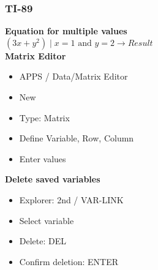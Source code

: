 	\begin{minipage}[t]{9.5cm}
		\subsubsection{TI-89}
			\textbf{Equation for multiple values}\\
			$(3x+y^2) \mid x=1 \text{ and } y=2 \to Result$\\
			\textbf{Matrix Editor}
			\begin{itemize}
			  \item APPS / Data/Matrix Editor
			  \item New
			  \item Type: Matrix
			  \item Define Variable, Row, Column
			  \item Enter values
			\end{itemize}

			\textbf{Delete saved variables}
			\begin{itemize}
			\item Explorer: 2nd / VAR-LINK
			\item Select variable
			\item Delete: DEL
			\item Confirm deletion: ENTER
			\end{itemize}

	\end{minipage}
